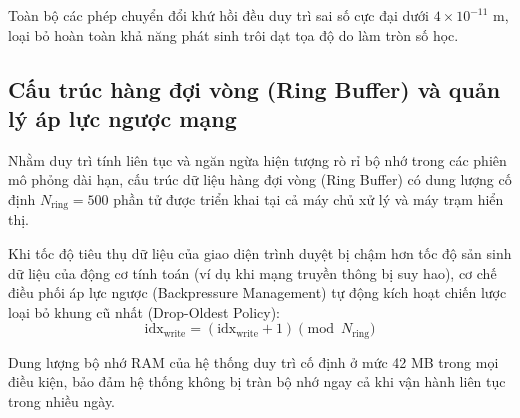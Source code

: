 Toàn bộ các phép chuyển đổi khứ hồi đều duy trì sai số cực đại dưới $4 \times 10^{-11}$ m, loại bỏ hoàn toàn khả năng phát sinh trôi dạt tọa độ do làm tròn số học.

\subsection{Cấu trúc hàng đợi vòng (Ring Buffer) và quản lý áp lực ngược mạng}

\hspace{0.5cm} Nhằm duy trì tính liên tục và ngăn ngừa hiện tượng rò rỉ bộ nhớ trong các phiên mô phỏng dài hạn, cấu trúc dữ liệu hàng đợi vòng (Ring Buffer) có dung lượng cố định $N_{\text{ring}} = 500$ phần tử được triển khai tại cả máy chủ xử lý và máy trạm hiển thị.

Khi tốc độ tiêu thụ dữ liệu của giao diện trình duyệt bị chậm hơn tốc độ sản sinh dữ liệu của động cơ tính toán (ví dụ khi mạng truyền thông bị suy hao), cơ chế điều phối áp lực ngược (Backpressure Management) tự động kích hoạt chiến lược loại bỏ khung cũ nhất (Drop-Oldest Policy):
\begin{equation}
\text{idx}_{\text{write}} = (\text{idx}_{\text{write}} + 1) \pmod{N_{\text{ring}}}
\label{eq:ring-buffer-write}
\end{equation}

\begin{table}[H]
\centering
\caption{Đo đạc dung lượng bộ nhớ RAM và tỷ lệ duy trì khung hình dưới các điều kiện mạng}
\label{tab:ring-buffer-network-conditions}
\end{table}

Dung lượng bộ nhớ RAM của hệ thống duy trì cố định ở mức 42 MB trong mọi điều kiện, bảo đảm hệ thống không bị tràn bộ nhớ ngay cả khi vận hành liên tục trong nhiều ngày.

